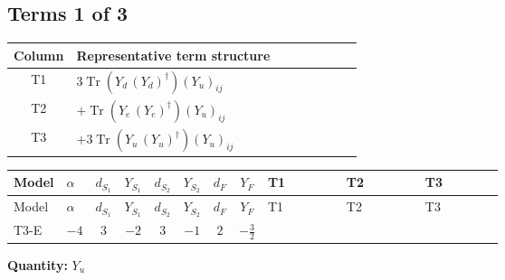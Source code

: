 \documentclass[8pt]{article}
\begin{document}
\begin{landscape}
\subsection*{Terms 1 of 3}
\begin{center}
\begin{tabular}{@{}c >{\raggedright\arraybackslash}p{0.82\linewidth}@{}}
\toprule
Column & Representative term structure \\
\midrule
T1 & \(\displaystyle 3 \operatorname{Tr}\!\left({Y_d}\,\left({Y_d}\right)^{\dagger}\right) \left({Y_u}\right)_{ij}\) \\
\midrule
T2 & \(\displaystyle +\operatorname{Tr}\!\left({Y_e}\,\left({Y_e}\right)^{\dagger}\right) \left({Y_u}\right)_{ij}\) \\
\midrule
T3 & \(\displaystyle +3 \operatorname{Tr}\!\left({Y_u}\,\left({Y_u}\right)^{\dagger}\right) \left({Y_u}\right)_{ij}\) \\
\midrule
\bottomrule
\end{tabular}
\end{center}
\smallskip
\tiny
\begin{longtable}{@{}llcccccc >{\raggedright\arraybackslash}p{0.21\linewidth} >{\raggedright\arraybackslash}p{0.21\linewidth} >{\raggedright\arraybackslash}p{0.21\linewidth}@{}}
\toprule
Model & $\alpha$ & $d_{S_1}$ & $Y_{S_1}$ & $d_{S_2}$ & $Y_{S_2}$ & $d_F$ & $Y_F$ & T1 & T2 & T3 \\
\midrule
\endfirsthead
\toprule
Model & $\alpha$ & $d_{S_1}$ & $Y_{S_1}$ & $d_{S_2}$ & $Y_{S_2}$ & $d_F$ & $Y_F$ & T1 & T2 & T3 \\
\midrule
\endhead
T3-E & $-4$ & $3$ & $-2$ & $3$ & $-1$ & $2$ & $-\frac{3}{2}$ & \scriptsize\adjustbox{max width=\linewidth}{$\begin{gathered} 3 \operatorname{Tr}\!\left({Y_d}\,\left({Y_d}\right)^{\dagger}\right) \left({Y_u}\right)_{ij}\end{gathered}$} & \scriptsize\adjustbox{max width=\linewidth}{$\begin{gathered} +\operatorname{Tr}\!\left({Y_e}\,\left({Y_e}\right)^{\dagger}\right) \left({Y_u}\right)_{ij}\end{gathered}$} & \scriptsize\adjustbox{max width=\linewidth}{$\begin{gathered} +3 \operatorname{Tr}\!\left({Y_u}\,\left({Y_u}\right)^{\dagger}\right) \left({Y_u}\right)_{ij}\end{gathered}$} \\
\midrule
\bottomrule
\end{longtable}
\clearpage
\noindent\textbf{Quantity: }$Y_u$\par\smallskip

\end{landscape}
\end{document}
